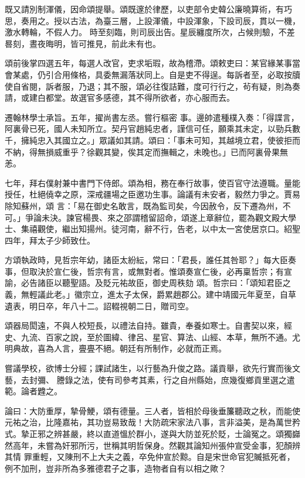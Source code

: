 \begin{pinyinscope}
 既又請別制渾儀，因命頌提舉。頌既邃於律歷，以吏部令史韓公廉曉算術，有巧思，奏用之。授以古法，為臺三層，上設渾儀，中設渾象，下設司辰，貫以一機，激水轉輪，不假人力。
 時至刻臨，則司辰出告。星辰纏度所次，占候則驗，不差晷刻，晝夜晦明，皆可推見，前此未有也。



 頌前後掌四選五年，每選人改官，吏求垢瑕，故為稽滯。頌敕吏曰：某官緣某事當會某處，仍引合用條格，具委無漏落狀同上。自是吏不得逞。每訴者至，必取按牘使自省閱，訴者服，乃退；其不服，頌必往復詰難，度可行行之，茍有疑，則為奏請，或建白都堂。故選官多感德，其不得所欲者，亦心服而去。



 遷翰林學士承旨。五年，擢尚書左丞。嘗行樞密
 事。邊帥遣種樸入奏：「得諜言，阿裏骨已死，國人未知所立。契丹官趙純忠者，謹信可任，願乘其未定，以勁兵數千，擁純忠入其國立之。」眾議如其請。頌曰：「事未可知，其越境立君，使彼拒而不納，得無損威重乎？徐觀其變，俟其定而撫輯之，未晚也。」已而阿裏骨果無恙。



 七年，拜右僕射兼中書門下侍郎。頌為相，務在奉行故事，使百官守法遵職。量能授任，杜絕僥幸之原，深戒疆場之臣邀功生事。論議有未安者，毅然力爭之。賈易除知蘇州，頌
 言：「易在御史名敢言，既為監司矣，今因赦令，反下遷為州，不可。」爭論未決。諫官楊畏、來之邵謂稽留詔命，頌遂上章辭位，罷為觀文殿大學士、集禧觀使，繼出知揚州。徒河南，辭不行，告老，以中太一宮使居京口。紹聖四年，拜太子少師致仕。



 方頌執政時，見哲宗年幼，諸臣太紛紜，常曰：「君長，誰任其咎耶？」每大臣奏事，但取決於宣仁後，哲宗有言，或無對者。惟頌奏宣仁後，必再稟哲宗；有宣諭，必告諸臣以聽聖語。及貶元祐故臣，御史周秩劾
 頌。哲宗曰：「頌知君臣之義，無輕議此老。」徽宗立，進太子太保，爵累趙郡公。建中靖國元年夏至，自草遺表，明日卒，年八十二。詔輟視朝二日，贈司空。



 頌器局閎遠，不與人校短長，以禮法自持。雖貴，奉養如寒士。自書契以來，經史、九流、百家之說，至於圖緯、律呂、星官、算法、山經、本草，無所不通。尤明典故，喜為人言，亹亹不絕。朝廷有所制作，必就而正焉。



 嘗議學校，欲博士分經；課試諸生，以行藝為升俊之路。議貢舉，欲先行實而後文藝，去封彌、
 謄錄之法，使有司參考其素，行之自州縣始，庶幾復鄉貢里選之遣範。論者韙之。



 論曰：大防重厚，摯骨鯁，頌有德量。三人者，皆相於母後垂簾聽政之秋，而能使元祐之治，比隆嘉祐，其功豈易致哉！大防疏宋家法八事，言非溢美，是為萬世矜式。摯正邪之辨甚嚴，終以直道慍於群小，遂與大防並死於貶，士論冤之。頌獨巋然高年，未嘗為奸邪所污，世稱其明哲保身。然觀其論知州張仲宣受金事，犯顏辨其情
 罪重輕，又陳刑不上大夫之義，卒免仲宣於黥。自是宋世命官犯贓抵死者，例不加刑，豈非所為多雅德君子之事，造物者自有以相之歟？



\end{pinyinscope}